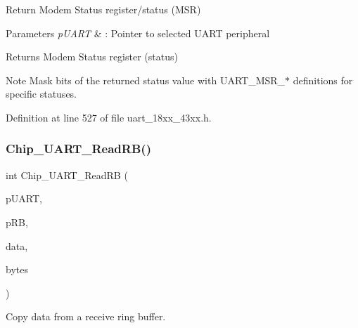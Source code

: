 Return Modem Status register/status (M\+SR) 


\begin{DoxyParams}{Parameters}
{\em p\+U\+A\+RT} & \+: Pointer to selected U\+A\+RT peripheral \\
\hline
\end{DoxyParams}
\begin{DoxyReturn}{Returns}
Modem Status register (status) 
\end{DoxyReturn}
\begin{DoxyNote}{Note}
Mask bits of the returned status value with U\+A\+R\+T\+\_\+\+M\+S\+R\+\_\+$\ast$ definitions for specific statuses. 
\end{DoxyNote}


Definition at line 527 of file uart\+\_\+18xx\+\_\+43xx.\+h.

\mbox{\label{group___u_a_r_t__18_x_x__43_x_x_gab54219751466a0fa8d9e75f8689ac99d}} 
\subsubsection{\texorpdfstring{Chip\+\_\+\+U\+A\+R\+T\+\_\+\+Read\+R\+B()}{Chip\_UART\_ReadRB()}}
{\footnotesize\ttfamily int Chip\+\_\+\+U\+A\+R\+T\+\_\+\+Read\+RB (\begin{DoxyParamCaption}\item[{\hyperlink{struct_l_p_c___u_s_a_r_t___t}{L\+P\+C\+\_\+\+U\+S\+A\+R\+T\+\_\+T} $\ast$}]{p\+U\+A\+RT,  }\item[{\hyperlink{struct_r_i_n_g_b_u_f_f___t}{R\+I\+N\+G\+B\+U\+F\+F\+\_\+T} $\ast$}]{p\+RB,  }\item[{void $\ast$}]{data,  }\item[{int}]{bytes }\end{DoxyParamCaption})}



Copy data from a receive ring buffer. 


